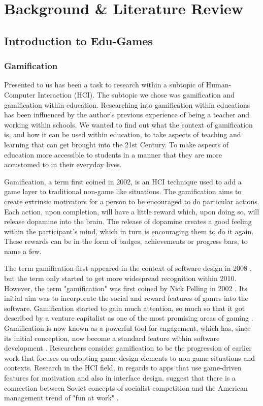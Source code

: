 \chapter{Background \& Literature Review}
	\label{chap:background_lit_review}
	
	
	\section{Introduction to Edu-Games}
	
	
	
	\subsection{Gamification}
	Presented to us has been a task to research within a subtopic of Human-Computer Interaction (HCI). The subtopic we chose was gamification and gamification within education. Researching into gamification within educations has been influenced by the author's previous experience of being a teacher and working within schools. We wanted to find out what the context of gamification is, and how it can be used within education, to take aspects of teaching and learning that can get brought into the 21st Century. To make aspects of education more accessible to students in a manner that they are more accustomed to in their everyday lives. 
	
	Gamification, a term first coined in 2002, is an HCI technique used to add a game layer to traditional non-game like situations. The gamification aims to create extrinsic motivators for a person to be encouraged to do particular actions. Each action, upon completion, will have a little reward which, upon doing so, will release dopamine into the brain. The release of dopamine creates a good feeling within the participant's mind, which in turn is encouraging them to do it again. These rewards can be in the form of badges, achievements or progress bars, to name a few.
	
	The term gamification first appeared in the context of software design in 2008 \cite{4}, but the term only started to get more widespread recognition within 2010. However, the term "gamification" was first coined by Nick Pelling in 2002 \cite{3e}. Its initial aim was to incorporate the social and reward features of games into the software. Gamification started to gain much attention, so much so that it got described by a venture capitalist as one of the most promising areas of gaming \cite{5}. Gamification is now known as a powerful tool for engagement, which has, since its initial conception, now become a standard feature within software development \cite{3e}. Researchers consider gamification to be the progression of earlier work that focuses on adopting game-design elements to non-game situations and contexts. Research in the HCI field, in regards to apps that use game-driven features for motivation and also in interface design, suggest that there is a connection between Soviet concepts of socialist competition and the American management trend of "fun at work" \cite{5}.
	
